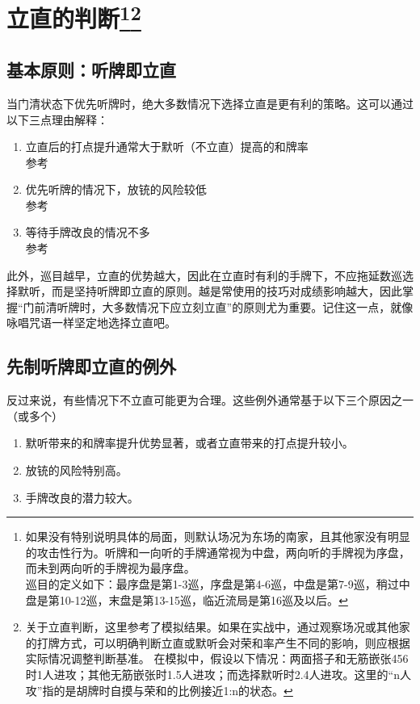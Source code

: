\chapter[立直的判断]{立直的判断\footnote{如果没有特别说明具体的局面，则默认场况为东场的南家，且其他家没有明显的攻击性行为。听牌和一向听的手牌通常视为中盘，两向听的手牌视为序盘，而未到两向听的手牌视为最序盘。\\ 巡目的定义如下：最序盘是第1-3巡，序盘是第4-6巡，中盘是第7-9巡，稍过中盘是第10-12巡，末盘是第13-15巡，临近流局是第16巡及以后。}\footnote{关于立直判断，这里参考了模拟结果。如果在实战中，通过观察场况或其他家的打牌方式，可以明确判断立直或默听会对荣和率产生不同的影响，则应根据实际情况调整判断基准。
在模拟中，假设以下情况：两面搭子和无筋嵌张456时1人进攻；其他无筋嵌张时1.5人进攻；而选择默听时2.4人进攻。这里的“n人攻”指的是胡牌时自摸与荣和的比例接近1:n的状态。}}
\section{基本原则：听牌即立直}
当门清状态下优先听牌时，绝大多数情况下选择立直是更有利的策略。这可以通过以下三点理由解释：
\begin{enumerate}
    \item 立直后的打点提升通常大于默听（不立直）提高的和牌率\\
          参考
    \item 优先听牌的情况下，放铳的风险较低\\
          参考
    \item 等待手牌改良的情况不多\\
          参考
\end{enumerate}
此外，巡目越早，立直的优势越大，因此在立直时有利的手牌下，不应拖延数巡选择默听，而是坚持听牌即立直的原则。越是常使用的技巧对成绩影响越大，因此掌握“门前清听牌时，大多数情况下应立刻立直”的原则尤为重要。记住这一点，就像咏唱咒语一样坚定地选择立直吧。

\section{先制听牌即立直的例外}
反过来说，有些情况下不立直可能更为合理。这些例外通常基于以下三个原因之一（或多个）
\begin{enumerate}
    \item 默听带来的和牌率提升优势显著，或者立直带来的打点提升较小。
    \item 放铳的风险特别高。
    \item 手牌改良的潜力较大。
\end{enumerate}

